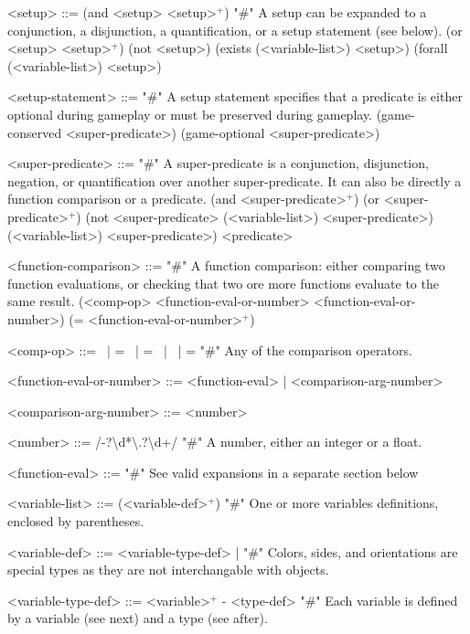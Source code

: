 \documentclass{article}
\begin{document}
\begin{grammar}
<setup> ::= (and <setup> <setup>$^+$) "#" A setup can be expanded to a conjunction, a disjunction, a quantification, or a setup statement (see below).
    \alt (or <setup> <setup>$^+$)
    \alt (not <setup>)
    \alt (exists (<variable-list>) <setup>)
    \alt (forall (<variable-list>) <setup>)

<setup-statement> ::= "#" A setup statement specifies that a predicate is either optional during gameplay or must be preserved during gameplay.
    \alt (game-conserved <super-predicate>)
    \alt (game-optional <super-predicate>)

<super-predicate> ::= "#" A super-predicate is a conjunction, disjunction, negation, or quantification over another super-predicate. It can also be directly a function comparison or a predicate.
    \alt (and <super-predicate>$^+$)
    \alt (or <super-predicate>$^+$)
    \alt (not <super-predicate>
    \alt (<variable-list>) <super-predicate>)
    \alt (<variable-list>) <super-predicate>)
    \alt <predicate>


<function-comparison> ::= "#" A function comparison: either comparing two function evaluations, or checking that two ore more functions evaluate to the same result.
    \alt (<comp-op> <function-eval-or-number> <function-eval-or-number>)
    \alt (= <function-eval-or-number>$^+$)

<comp-op> ::=  \textlangle \ | \textlangle = \ | = \ | \textrangle \ | \textrangle = "#" Any of the comparison operators.

<function-eval-or-number> ::= <function-eval> | <comparison-arg-number>

<comparison-arg-number> ::= <number>

<number> ::=  /-?\textbackslash d*\textbackslash .?\textbackslash d+/  "#" A number, either an integer or a float.

<function-eval> ::= "#" See valid expansions in a separate section below


<variable-list> ::= (<variable-def>$^+$) "#" One or more variables definitions, enclosed by parentheses.

<variable-def> ::= <variable-type-def>
     |
     "#" Colors, sides, and orientations are special types as they are not interchangable with objects.

<variable-type-def> ::= <variable>$^+$ - <type-def> "#" Each variable is defined by a variable (see next) and a type (see after).


\end{grammar}
\end{document}

